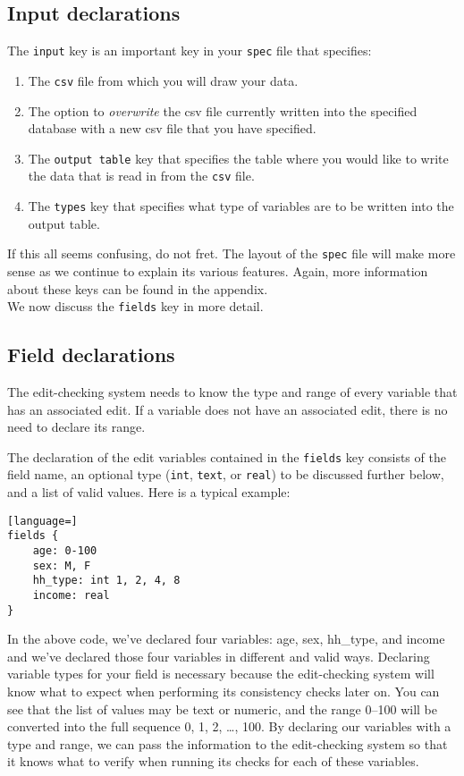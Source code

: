\documentclass{article}
\begin{document}
\subsection{Input declarations}
The {\tt input} key is an important key in your {\tt spec} file that specifies:
\begin{enumerate}
\item The {\tt csv} file from which you will draw your data.
\item The option to \textit{overwrite} the csv file currently written into the specified database with 
a new csv file that you have specified.
\item The {\tt output table} key that specifies the table where you would like to 
write the data that is read in from the {\tt csv} file.
\item The {\tt types} key that specifies what type of variables are to be written 
into the output table.
\end{enumerate}

If this all seems confusing, do not fret. The layout of the {\tt spec} file will make more sense 
as we continue to explain its various features. Again, more information about these keys can be 
found in the appendix.\\

We now discuss the {\tt fields} key in more detail.


\subsection{Field declarations} The edit-checking system needs to know the type and range
of every variable that has an associated edit. If a variable does not have an associated
edit, there is no need to declare its range.

The declaration of the edit variables contained in the {\tt fields} key consists of the field name, 
an optional type ({\tt int}, {\tt text}, or 
{\tt real}) to be discussed further below, and a list of valid values. Here is a typical example:

\begin{lstlisting}[language=]
fields {
    age: 0-100
    sex: M, F
    hh_type: int 1, 2, 4, 8
    income: real
}
\end{lstlisting}

In the above code, we've declared four variables: age, sex, hh\_type, and income and we've 
declared those four variables in different and valid ways. Declaring variable types for your 
field is necessary because the edit-checking system will know what to expect when performing 
its consistency checks later on. You can see that the list of values may be text 
or numeric, and the range 0--100 will be converted into the full sequence 0, 1, 2, \dots, 100. 
By declaring our variables with a type and range, we can pass the information to the edit-checking system 
so that it knows what to verify when running its checks for each of these variables. 
\end{document}

